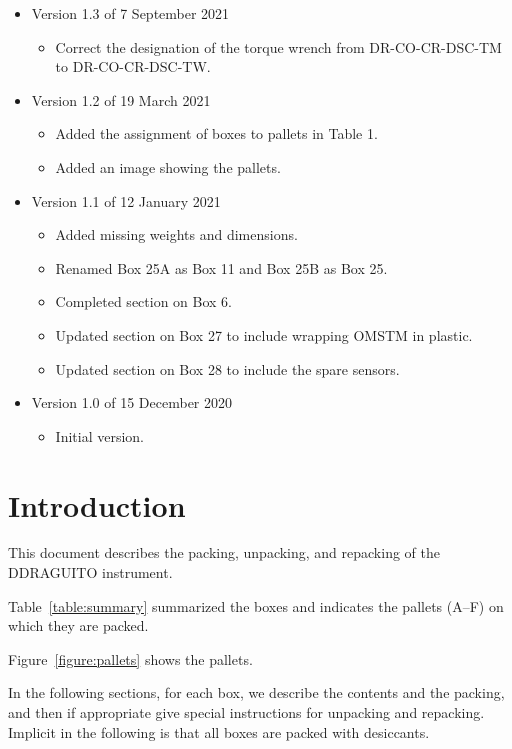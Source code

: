 \documentclass{article}
\begin{document}
\begin{itemize}
\item Version 1.3 of 7 September 2021
\begin{itemize}
    \item Correct the designation of the torque wrench from DR-CO-CR-DSC-TM to DR-CO-CR-DSC-TW.
\end{itemize}

\item Version 1.2 of 19 March 2021
\begin{itemize}
    \item Added the assignment of boxes to pallets in Table 1.
    \item Added an image showing the pallets.
\end{itemize}

\item Version 1.1 of 12 January 2021
\begin{itemize}
    \item Added missing weights and dimensions.
    \item Renamed Box 25A as Box 11 and Box 25B as Box 25.
    \item Completed section on Box 6.
    \item Updated section on Box 27 to include wrapping OMSTM in plastic.
    \item Updated section on Box 28 to include the spare sensors.
\end{itemize}

\item Version 1.0 of 15 December 2020
\begin{itemize}
    \item Initial version.
\end{itemize}
\end{itemize}
\clearpage


\section{Introduction}

This document describes the packing, unpacking, and repacking of the DDRAGUITO instrument.

Table~\ref{table:summary} summarized the boxes and indicates the pallets (A--F) on which they are packed.

Figure~\ref{figure:pallets} shows the pallets.

In the following sections, for each box, we describe the contents and the packing, and then if appropriate give special instructions for unpacking and repacking. Implicit in the following is that all boxes are packed with desiccants.
\end{document}
